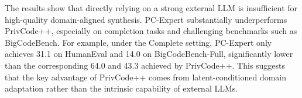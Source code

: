 \documentclass{article}
\theoremstyle{plain}
\theoremstyle{definition}
\theoremstyle{remark}
\def \toolname{PrivCode++}
\begin{document}
{The results show that directly relying on a strong external LLM is insufficient for high-quality domain-aligned synthesis. PC-Expert substantially underperforms \toolname{}, especially on completion tasks and challenging benchmarks such as BigCodeBench. For example, under the Complete setting, PC-Expert only achieves 31.1 on HumanEval and 14.0 on BigCodeBench-Full, significantly lower than the corresponding 64.0 and 43.3 achieved by \toolname{}. This suggests that the key advantage of \toolname{} comes from latent-conditioned domain adaptation rather than the intrinsic capability of external LLMs.



\begin{table}[t]
\centering
\scriptsize
\caption{Ablation of \toolname{} on replaceable external modules evaluated on HumanEval, MBPP, and EvalPlus benchmarks. ``$\checkmark$'' denotes replacing the corresponding module with Llama-3.1-8B-Instruct, while ``$\times$" denotes the default setting using Llama-3.1-70B-Instruct.}
\label{tab:external}
\end{table}















}
\end{document}
